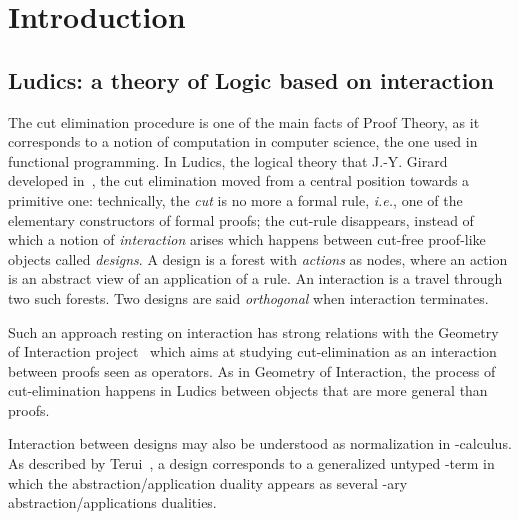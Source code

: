 \documentclass{LMCS}
\def\ie{{\em i.e.}}
\newcommand{\Rouge}[1]{{\color{black}#1}}
\begin{document}
\maketitle\vfill


\section{Introduction}
\Rouge{
\subsection{Ludics: a theory of Logic based on interaction} The cut elimination procedure is one of the main facts of Proof Theory, as it corresponds to a notion of computation in computer science, the one used in functional programming. In Ludics, the logical theory that J.-Y. Girard developed in~\cite{DBLP:journals/mscs/Girard01}, the cut elimination moved from a central position towards a primitive one: technically, the {\it cut} is no more a formal rule, \ie, one of the elementary constructors of formal proofs; the cut-rule disappears, instead of which a notion of {\em interaction} arises which happens between cut-free proof-like objects called {\it designs}. A design is a forest with {\em actions} as nodes, where an action is an abstract view of an application of a rule. An interaction is a travel through two such forests. Two designs are said {\it orthogonal} when interaction terminates.

Such an approach resting on interaction has strong relations with the Geometry of Interaction project~\cite{DBLP:conf/colog/Girard88,towards} which aims at studying cut-elimination as an interaction between proofs seen as operators. As in Geometry of Interaction, the process of cut-elimination happens in Ludics between objects that are more general than proofs.

Interaction between designs may also be understood as normalization in -calculus. As described by Terui~\cite{DBLP:journals/tcs/Terui11}, a design corresponds to a generalized untyped -term in which the abstraction/application duality appears as several -ary abstraction/applications dualities.

}
\end{document}
